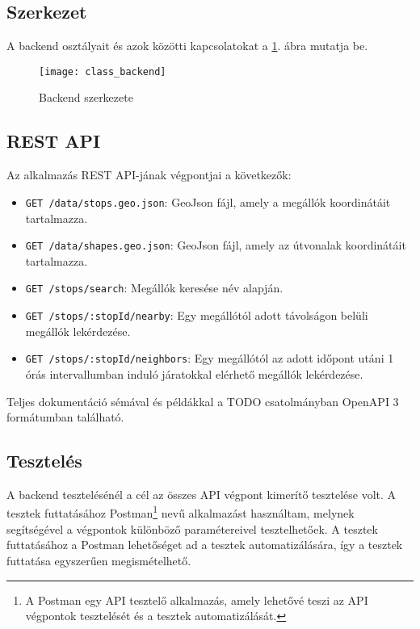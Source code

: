 \subsection{Szerkezet}

A backend osztályait és azok közötti kapcsolatokat a \ref{fig:backend-structure}. ábra mutatja be.

\begin{figure}[H]
    \centering
    \texttt{[image: class\_backend]}
    \caption{Backend szerkezete}
    \label{fig:backend-structure}
\end{figure}

\subsection{REST API}

Az alkalmazás REST API-jának végpontjai a következők:

\begin{itemize}
    \item \texttt{GET /data/stops.geo.json}: GeoJson fájl, amely a megállók koordinátáit tartalmazza.
    \item \texttt{GET /data/shapes.geo.json}: GeoJson fájl, amely az útvonalak koordinátáit tartalmazza.
    \item \texttt{GET /stops/search}: Megállók keresése név alapján.
    \item \texttt{GET /stops/:stopId/nearby}: Egy megállótól adott távolságon belüli megállók lekérdezése.
    \item \texttt{GET /stops/:stopId/neighbors}: Egy megállótól az adott időpont utáni 1 órás intervallumban induló járatokkal elérhető megállók lekérdezése.
\end{itemize}

Teljes dokumentáció sémával és példákkal a TODO csatolmányban OpenAPI 3 formátumban található.

\subsection{Tesztelés}

A backend tesztelésénél a cél az összes API végpont kimerítő tesztelése volt. A tesztek futtatásához Postman\footnote{A Postman egy API tesztelő alkalmazás, amely lehetővé teszi az API végpontok tesztelését és a tesztek automatizálását.} nevű alkalmazást használtam, melynek segítségével a végpontok különböző paramétereivel tesztelhetőek. A tesztek futtatásához a Postman lehetőséget ad a tesztek automatizálására, így a tesztek futtatása egyszerűen megismételhető.

